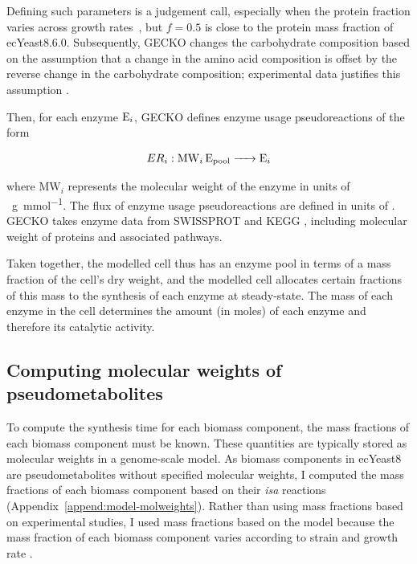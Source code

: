 Defining such parameters is a judgement call, especially when the protein fraction varies across growth rates~\parencite{elsemmanWholecellModelingYeast2022}, but $f = 0.5$ is close to the protein mass fraction of ecYeast8.6.0.
Subsequently, GECKO changes the carbohydrate composition based on the assumption that a change in the amino acid composition is offset by the reverse change in the carbohydrate composition;
experimental data justifies this assumption \parencite{nissenFluxDistributionsAnaerobic1997}.

Then, for each enzyme $\ce{E_{i}}$, GECKO defines enzyme usage pseudoreactions of the form

\begin{equation}
  ER_{i}: \ce{ MW_{i} E_{\mathrm{pool}} -> E_{i} }
  \label{eq:model-gecko-enzyme-usage}
\end{equation}

where $\mathrm{MW}_{i}$ represents the molecular weight of the enzyme in units of \SI{}{\gram~\milli\mole^{-1}}.
The flux of enzyme usage pseudoreactions are defined in units of \SI{}{\mmolgdw}.
GECKO takes enzyme data from SWISSPROT \parencite{theuniprotconsortiumUniProtUniversalProtein2023} and KEGG \parencite{kanehisaKEGGTaxonomybasedAnalysis2023}, including molecular weight of proteins and associated pathways.

Taken together, the modelled cell thus has an enzyme pool in terms of a mass fraction of the cell's dry weight, and the modelled cell allocates certain fractions of this mass to the synthesis of each enzyme at steady-state.
The mass of each enzyme in the cell determines the amount (in moles) of each enzyme and therefore its catalytic activity.


\subsection{Computing molecular weights of pseudometabolites}
\label{subsec:model-yeast8-molweights}

To compute the synthesis time for each biomass component, the mass fractions of each biomass component must be known.
These quantities are typically stored as molecular weights in a genome-scale model.
As biomass components in ecYeast8 are pseudometabolites without specified molecular weights, I computed the mass fractions of each biomass component based on their \textit{isa} reactions (Appendix~\ref{append:model-molweights}).
Rather than using mass fractions based on experimental studies, I used mass fractions based on the model because the mass fraction of each biomass component varies according to strain and growth rate \parencite{nilssonMetabolicTradeoffsYeast2016, elsemmanWholecellModelingYeast2022}.

